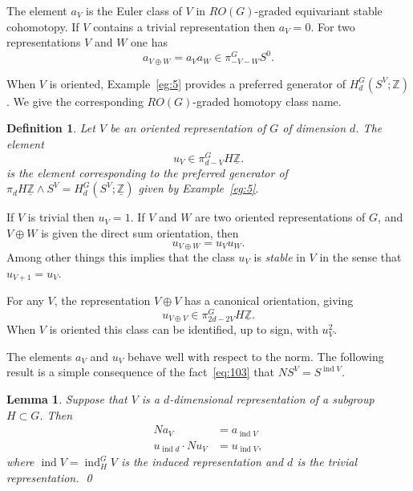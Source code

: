 \documentclass{amsart}
\newtheorem{lem}[equation]{Lemma}
\newtheorem{definition}[equation]{Definition}
\newenvironment{defin}{\begin{definition}\rm}{\end{definition}}
\theoremstyle{definition}
\newtheorem{defin}[equation]{Definition}
\theoremstyle{remark}
\newcommand{\Z}{{\mathbb Z}}
\newcommand{\norm}{N}
\newcommand{\Zm}{\underline{\Z}}
\DeclareMathOperator{\ind}{ind}
\begin{document}
The element $a_{V}$ is the Euler class of $V$ in $RO(G)$-graded
equivariant stable cohomotopy.  If $V$ contains a trivial
representation then $a_{V}=0$.  For two representations $V$ and $W$
one has
\[
a_{V\oplus W}=a_{V}a_{W}\in \pi^{G}_{-V-W}S^{0}.
\]

When $V$ is oriented, Example~\ref{eg:5} provides a preferred
generator of $H^{G}_{d}(S^{V};\Z)$.  We give the corresponding
$RO(G)$-graded homotopy class name.

\begin{defin}
\label{def:54} Let $V$ be an oriented representation of $G$ of
dimension $d$.  The element
\[
u_{V}\in\pi^{G}_{d-V}H\Zm.
\]
is the element corresponding to the preferred generator of $\pi_{d}
H\Zm\wedge S^{V}= H^{G}_{d}(S^{V};\Zm)$ given by Example~\ref{eg:5}.   
\end{defin}

If $V$ is trivial then $u_{V}=1$.  If $V$ and $W$ are two oriented
representations of $G$, and $V\oplus W$ is given the direct sum
orientation, then
\[
u_{V\oplus W}=u_{V}u_{W}.
\]
Among other things this implies that the class $u_{V}$ is {\em stable}
in $V$ in the sense that $u_{V+1}=u_{V}$.

For any $V$, the representation $V\oplus V$ has a canonical
orientation, giving 
\[
u_{V\oplus V}\in\pi^{G}_{2d-2V} H\Zm.
\]
When $V$ is oriented this class can be identified, up to sign, with
$u_{V}^{2}$.

The elements $a_{V}$ and $u_{V}$ behave well with respect to the norm.
The following result is a simple consequence of the
fact~\eqref{eq:103} that $\norm S^{V}=S^{\ind V}$.
\begin{lem}
\label{thm:138} Suppose that $V$ is a $d$-dimensional representation
of a subgroup $H\subset G$.  Then
\begin{align*}
\norm a_{V} &= a_{\ind V} \\
u_{\ind d}\cdot \norm u_{V} &= u_{\ind V},
\end{align*}
where $\ind V=\ind_{H}^{G}V$ is the induced representation and $d$ is
the trivial representation.   \qed
\end{lem}
\end{document}
